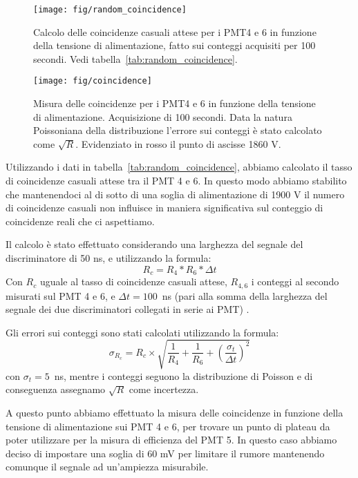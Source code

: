 \documentclass[a4paper,10pt]{article}
\begin{document}
\begin{figure}
\centering
\texttt{[image: fig/random\_coincidence]}
\caption{Calcolo delle coincidenze casuali attese per i PMT4 e 6 in funzione della tensione di alimentazione, fatto sui conteggi acquisiti per 100 secondi. Vedi tabella~\ref{tab:random_coincidence}.}
\label{fig:random_coincidence}
\end{figure}

\begin{figure}
\centering
\texttt{[image: fig/coincidence]}
\caption{Misura delle coincidenze per i PMT4 e 6 in funzione della tensione di alimentazione. Acquisizione di 100 secondi. Data la natura Poissoniana della distribuzione l'errore sui conteggi è stato calcolato come $\sqrt{R}$. Evidenziato in rosso il punto di ascisse 1860 V.}
\label{fig:coincidence}
\end{figure}

Utilizzando i dati in tabella~\ref{tab:random_coincidence}, abbiamo calcolato il tasso di coincidenze casuali attese tra il PMT 4 e 6. In questo modo abbiamo stabilito che mantenendoci al di sotto di una soglia di alimentazione di 1900 V il numero di coincidenze casuali non influisce in maniera significativa sul conteggio di coincidenze reali che ci aspettiamo. 

Il calcolo è stato effettuato considerando una larghezza del segnale del discriminatore di 50 ns, e utilizzando la formula:
\begin{equation}
R_{c} = R_{4}*R_{6}*\Delta t
\label{eq:random_coincidence}
\end{equation}
Con $R_{c}$ uguale al tasso di coincidenze casuali attese, $R_{4,6}$ i conteggi al secondo misurati sul PMT 4 e 6, e $\Delta t = 100$~ns (pari alla somma della larghezza del segnale dei due discriminatori collegati in serie ai PMT) .

Gli errori sui conteggi sono stati calcolati utilizzando la formula:
\begin{equation}
\sigma_{R_{c}} = R_{c} \times{\sqrt{\frac{1}{R_{4}} + \frac{1}{R_{6}} + \left( \frac{\sigma_{t}}{\Delta t} \right)^2}  }
\end{equation}
con $\sigma_{t} = 5$~ns, mentre i conteggi seguono la distribuzione di Poisson e di conseguenza assegnamo $\sqrt{R}$ come incertezza.

A questo punto abbiamo effettuato la misura delle coincidenze in funzione della tensione di alimentazione sui PMT 4 e 6, per trovare un punto di plateau da poter utilizzare per la misura di efficienza del PMT 5.
In questo caso abbiamo deciso di impostare una soglia di 60 mV per limitare il rumore mantenendo comunque il segnale ad un'ampiezza misurabile. 
\end{document}
